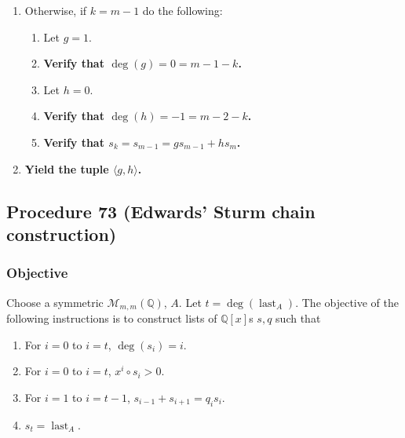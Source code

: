 \documentclass[twocolumn]{article}
\DeclareMathOperator{\last}{last}
\begin{document}
\begin{enumerate}
\begin{enumerate}
					\end{enumerate}
					\item Otherwise, if $k=m-1$ do the following:
					\begin{enumerate}
						\item Let $g=1$.
						\item \textbf{Verify that $\deg(g)=0=m-1-k$.}
						\item Let $h=0$.
						\item \textbf{Verify that $\deg(h)=-1=m-2-k$.}
						\item \textbf{Verify that $s_k=s_{m-1}=gs_{m-1}+hs_m$.}
					\end{enumerate}
					\item \textbf{Yield the tuple $\langle g,h\rangle$.}
				\end{enumerate}
		\subsection{Procedure 73 (Edwards' Sturm chain construction)}\label{sec:procedure 73}
			\subsubsection{Objective}
				Choose a symmetric $\mathcal{M}_{m,m}(\mathbb{Q})$, $A$. Let $t=\deg(\last_A)$. The objective of the following instructions is to construct lists of $\mathbb{Q}[x]$s $s,q$ such that
				\begin{enumerate}
					\item For $i=0$ to $i=t$, $\deg(s_i)=i$.
					\item For $i=0$ to $i=t$, $x^i\circ s_i>0$.
					\item For $i=1$ to $i=t-1$, $s_{i-1}+s_{i+1}=q_is_i$.
					\item $s_t=\last_A$.
				\end{enumerate}
\end{document}
